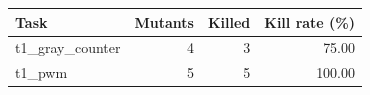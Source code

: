 \begin{tabular}{lrrr}
\toprule
Task & Mutants & Killed & Kill rate (\%) \\
\midrule
t1\_gray\_counter & 4 & 3 & 75.00 \\
t1\_pwm & 5 & 5 & 100.00 \\
\bottomrule
\end{tabular}
